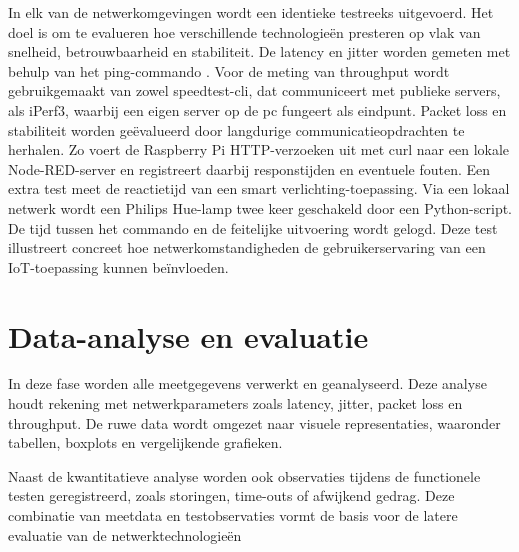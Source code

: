 In elk van de netwerkomgevingen wordt een identieke testreeks uitgevoerd. Het doel is om te evalueren hoe verschillende technologieën presteren op vlak van snelheid, betrouwbaarheid en stabiliteit.
De latency en jitter worden gemeten met behulp van het ping-commando . Voor de meting van throughput wordt gebruikgemaakt van zowel speedtest-cli, dat communiceert met publieke servers, als iPerf3, waarbij een eigen server op de pc fungeert als eindpunt.
Packet loss en stabiliteit worden geëvalueerd door langdurige communicatieopdrachten te herhalen. Zo voert de Raspberry Pi HTTP-verzoeken uit met curl naar een lokale Node-RED-server en registreert daarbij responstijden en eventuele fouten. 
Een extra test meet de reactietijd van een smart verlichting-toepassing. Via een lokaal netwerk wordt een Philips Hue-lamp twee keer geschakeld door een Python-script. De tijd tussen het commando en de feitelijke uitvoering wordt gelogd. Deze test illustreert concreet hoe netwerkomstandigheden de gebruikerservaring van een IoT-toepassing kunnen beïnvloeden.


\section{Data-analyse en evaluatie}

In deze fase worden alle meetgegevens verwerkt en geanalyseerd. Deze analyse houdt rekening met netwerkparameters zoals latency, jitter, packet loss en throughput. De ruwe data wordt omgezet naar visuele representaties, waaronder tabellen, boxplots en vergelijkende grafieken.

Naast de kwantitatieve analyse worden ook observaties tijdens de functionele testen geregistreerd, zoals storingen, time-outs of afwijkend gedrag. Deze combinatie van meetdata en testobservaties vormt de basis voor de latere evaluatie van de netwerktechnologieën







